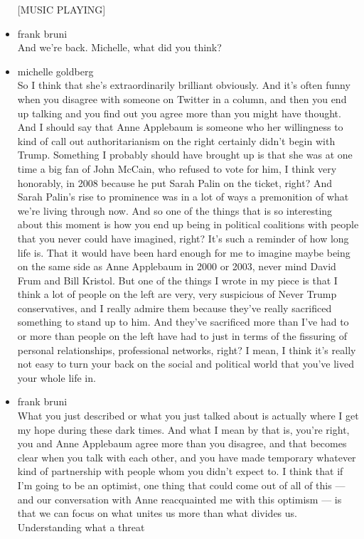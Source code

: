 \begin{itemize}
  {[}MUSIC PLAYING{]}
\item
  frank bruni\\
  And we're back. Michelle, what did you think?
\item
  michelle goldberg\\
  So I think that she's extraordinarily brilliant obviously. And it's
  often funny when you disagree with someone on Twitter in a column, and
  then you end up talking and you find out you agree more than you might
  have thought. And I should say that Anne Applebaum is someone who her
  willingness to kind of call out authoritarianism on the right
  certainly didn't begin with Trump. Something I probably should have
  brought up is that she was at one time a big fan of John McCain, who
  refused to vote for him, I think very honorably, in 2008 because he
  put Sarah Palin on the ticket, right? And Sarah Palin's rise to
  prominence was in a lot of ways a premonition of what we're living
  through now. And so one of the things that is so interesting about
  this moment is how you end up being in political coalitions with
  people that you never could have imagined, right? It's such a reminder
  of how long life is. That it would have been hard enough for me to
  imagine maybe being on the same side as Anne Applebaum in 2000 or
  2003, never mind David Frum and Bill Kristol. But one of the things I
  wrote in my piece is that I think a lot of people on the left are
  very, very suspicious of Never Trump conservatives, and I really
  admire them because they've really sacrificed something to stand up to
  him. And they've sacrificed more than I've had to or more than people
  on the left have had to just in terms of the fissuring of personal
  relationships, professional networks, right? I mean, I think it's
  really not easy to turn your back on the social and political world
  that you've lived your whole life in.
\item
  frank bruni\\
  What you just described or what you just talked about is actually
  where I get my hope during these dark times. And what I mean by that
  is, you're right, you and Anne Applebaum agree more than you disagree,
  and that becomes clear when you talk with each other, and you have
  made temporary whatever kind of partnership with people whom you
  didn't expect to. I think that if I'm going to be an optimist, one
  thing that could come out of all of this --- and our conversation with
  Anne reacquainted me with this optimism --- is that we can focus on
  what unites us more than what divides us. Understanding what a threat

\end{itemize}
